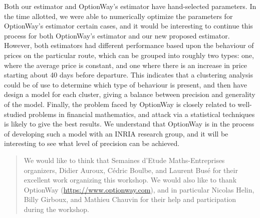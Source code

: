 \documentclass{article}
\begin{document}
Both our estimator and OptionWay's estimator have hand-selected
parameters.  In the time allotted, we were able to numerically
optimize the parameters for OptionWay's estimator certain cases, and
it would be interesting to continue this process for both OptionWay's
estimator and our new proposed estimator.  However, both estimators
had different performance based upon the behaviour of prices on the
particular route, which can be grouped into roughly two types: one,
where the average price is constant, and one where there is an
increase in price starting about 40 days before departure.  This
indicates that a clustering analysis could be of use to determine
which type of behaviour is present, and then have design a model for
each cluster, giving a balance between precision and generality of the
model.  Finally, the problem faced by OptionWay is closely related to
well-studied problems in financial mathematics, and attack via a
statistical techniques is likely to give the best results.  We
understand that OptionWay is in the process of developing such a model
with an INRIA research group, and it will be interesting to see what level
of precision can be achieved.

\renewcommand{\abstractname}{Acknowledgements}
\begin{abstract}
  We would like to think that Semaines d'Etude Maths-Entreprises
  organizers, Didier Auroux, C\'edric Boulbe, and Laurent Busé for
  their excellent work organizing this workshop.  We would also like
  to thank OptionWay (\url{https://www.optionway.com}), and in
  particular Nicolas Helin, Billy Girboux, and Mathieu Chauvin for
  their help and participation during the workshop.
\end{abstract}
\end{document}
